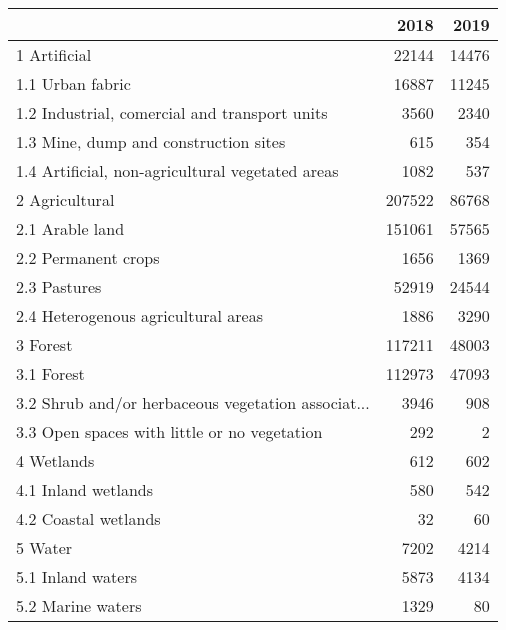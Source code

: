 \begin{tabular}{lrr}
\toprule
{} &    2018 &   2019 \\
\midrule
1 Artificial                                       &   22144 &  14476 \\
1.1 Urban fabric                                   &   16887 &  11245 \\
1.2 Industrial, comercial and transport units      &    3560 &   2340 \\
1.3 Mine, dump and construction sites              &     615 &    354 \\
1.4 Artificial, non-agricultural vegetated areas   &    1082 &    537 \\
\midrule
2 Agricultural                                     &  207522 &  86768 \\
2.1 Arable land                                    &  151061 &  57565 \\
2.2 Permanent crops                                &    1656 &   1369 \\
2.3 Pastures                                       &   52919 &  24544 \\
2.4 Heterogenous agricultural areas                &    1886 &   3290 \\
\midrule
3 Forest                                           &  117211 &  48003 \\
3.1 Forest                                         &  112973 &  47093 \\
3.2 Shrub and/or herbaceous vegetation associat... &    3946 &    908 \\
3.3 Open spaces with little or no vegetation       &     292 &      2 \\
\midrule
4 Wetlands                                         &     612 &    602 \\
4.1 Inland wetlands                                &     580 &    542 \\
4.2 Coastal wetlands                               &      32 &     60 \\
\midrule
5 Water                                            &    7202 &   4214 \\
5.1 Inland waters                                  &    5873 &   4134 \\
5.2 Marine waters                                  &    1329 &     80 \\
\bottomrule
\end{tabular}
